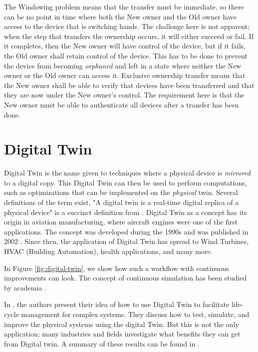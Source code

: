 The Windowing problem means that the transfer must be immediate, so there can be no point in time where both the New owner and the Old owner have access to the device that is switching hands. The challenge here is not apparent; when the step that transfers the ownership occurs, it will either succeed or fail. If it completes, then the New owner will have control of the device, but if it fails, the Old owner shall retain control of the device. This has to be done to prevent the device from becoming \emph{orphaned} and left in a state where neither the New owner or the Old owner can access it. 
Exclusive ownership transfer means that the New owner shall be able to verify that devices have been transferred and that they are now under the New owner's control. The requirement here is that the New owner must be able to authenticate all devices after a transfer has been done.



\section{Digital Twin}
\label{sec:digital_twin}
 Digital Twin is the name given to techniques where a physical device is \emph{mirrored} to a digital copy. This Digital Twin can then be used to perform computations, such as optimizations that can be implemented on the \emph{physical} twin. Several definitions of the term exist, "A digital twin is a real-time digital replica of a physical device" is a succinct definition from \cite{bacchiega2019}. Digital Twin as a concept has its origin in aviation manufacturing, where aircraft engines were one of the first applications. The concept was developed during the 1990s and was published in 2002 \cite{grieves2019virtually}. Since then, the application of Digital Twin has spread to Wind Turbines, HVAC (Building Automation), health applications, and many more. 

In Figure \ref{fig:digital-twin}, we show how such a workflow with continuous improvements can look. The concept of continuous simulation has been studied by academia \cite{boschert2016digital}.

In \cite{grieves2014digital}\cite{grieves2017digital}, the authors present their idea of how to use Digital Twin to facilitate life-cycle management for complex systems. They discuss how to test, simulate, and improve the physical systems using the digital Twin. But this is not the only application; many industries and fields investigate what benefits they can get from Digital twin. A summary of these results can be found in \cite{8424832}. 

